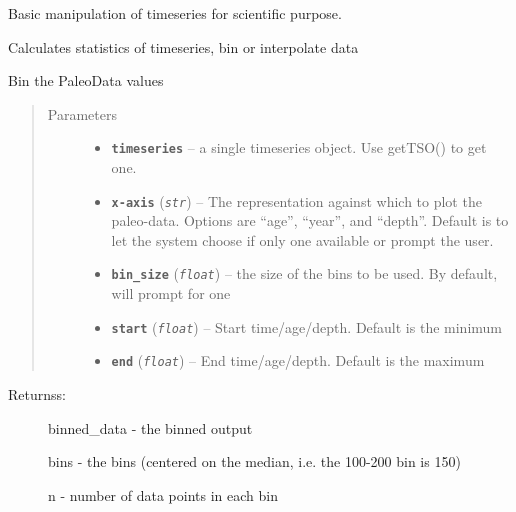 \documentclass[letterpaper,10pt,english]{sphinxmanual}
\begin{document}
\begin{fulllineitems}
\label{Basic:pyleoclim.Basic}
Basic manipulation of timeseries for scientific purpose.

Calculates statistics of timeseries, bin or interpolate data

\begin{fulllineitems}
\label{Basic:pyleoclim.Basic.bin_data}
Bin the PaleoData values
\begin{quote}\begin{description}
\item[{Parameters}] \leavevmode\begin{itemize}
\item {} 
\textbf{\texttt{timeseries}} -- a single timeseries object. Use getTSO() to get one.

\item {} 
\textbf{\texttt{x-axis}} (\emph{\texttt{str}}) -- The representation against which to plot the
paleo-data. Options are ``age'', ``year'', and ``depth''. Default
is to let the system choose if only one available or prompt
the user.

\item {} 
\textbf{\texttt{bin\_size}} (\emph{\texttt{float}}) -- the size of the bins to be used.
By default, will prompt for one

\item {} 
\textbf{\texttt{start}} (\emph{\texttt{float}}) -- Start time/age/depth. Default is the minimum

\item {} 
\textbf{\texttt{end}} (\emph{\texttt{float}}) -- End time/age/depth. Default is the maximum

\end{itemize}

\end{description}\end{quote}
\begin{description}
\item[{Returnss:}] \leavevmode
binned\_data - the binned output

bins - the bins (centered on the median, i.e. the 100-200 bin is 150)

n - number of data points in each bin


\end{description}
\end{fulllineitems}
\end{fulllineitems}
\end{document}
